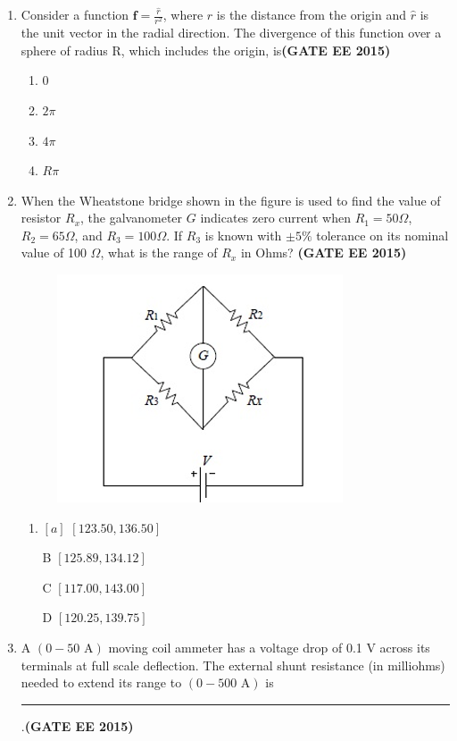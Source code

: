 \documentclass[a4paper,12pt]{exam}
\theoremstyle{remark}
\begin{document}
\begin{enumerate}
\item Consider a function    $\mathbf{f} = \frac{\hat{r}}{r^2}   $, where    $r   $ is the distance from the origin and    $\hat{r}   $ is the unit vector in the radial direction. The divergence of this function over a sphere of radius R, which includes the origin, is\hfill{\textbf{(GATE EE 2015)}}
\begin{multicols}{4}
\begin{enumerate}
  \item 0
  \item    $2\pi   $
  \item    $4\pi   $
  \item    $R \pi   $
\end{enumerate}
\end{multicols}
\item When the Wheatstone bridge shown in the figure is used to find the value of resistor    $R_x   $, the galvanometer    $G   $ indicates zero current when    $R_1 = 50 \Omega   $,    $R_2 = 65 \Omega   $, and    $R_3 = 100 \Omega   $. If    $R_3   $ is known with    $\pm 5\%   $ tolerance on its nominal value of 100    $\Omega   $, what is the range of    $R_x   $ in Ohms? \hfill{\textbf{(GATE EE 2015)}}
\begin{figure}[H]
    \centering
    \includegraphics[width=0.5\columnwidth]{figs/Q 15.png}
    \caption{}
    \label{fig:placeholder}
\end{figure}
\begin{multicols}{2}
\begin{enumerate}
    \item $[a]$    $[123.50, 136.50]   $
    \item [B]    $[125.89, 134.12]   $
    \item [C]    $[117.00, 143.00]   $
    \item [D]    $[120.25, 139.75]   $
\end{enumerate}
\end{multicols}
\item A    $(0-50 \text{ A})   $ moving coil ammeter has a voltage drop of 0.1 V across its terminals at full scale deflection. The external shunt resistance (in milliohms) needed to extend its range to    $(0-500 \text{ A})   $ is \rule{3cm}{0.15mm}.\hfill{\textbf{(GATE EE 2015)}}


\end{enumerate}
\end{document}

